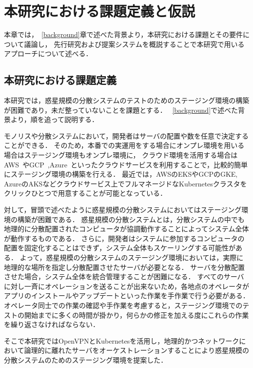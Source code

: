 \chapter{本研究における課題定義と仮説}
\label{issue}

本章では，~\ref{background}章で述べた背景より，本研究における課題とその要件について議論し，
先行研究および提案システムを概説することで本研究で用いるアプローチについて述べる．

\section{本研究における課題定義}
\label{issue:definition}

本研究では，惑星規模の分散システムのテストのためのステージング環境の構築が困難であり，未だ整っていないことを課題とする．
~\ref{background}で述べた背景より，順を追って説明する．

モノリスや分散システムにおいて，開発者はサーバの配置や数を任意で決定することができる．
そのため，本番での実運用をする場合にオンプレ環境を用いる場合はステージング環境もオンプレ環境に，
クラウド環境を活用する場合はAWS~\cite{AWS}やGCP~\cite{GCP},Azure~\cite{Azure}といったクラウドサービスを利用することで，比較的簡単にステージング環境の構築を行える．
最近では，AWSのEKSやGCPのGKE, AzureのAKSなどクラウドサービス上でフルマネージドなKubernetesクラスタをクリックひとつで用意することが可能となっている．

対して，冒頭で述べたように惑星規模の分散システムにおいてはステージング環境の構築が困難である．
惑星規模の分散システムとは，分散システムの中でも地理的に分散配置されたコンピュータが協調動作することによってシステム全体が動作するものである．
さらに，開発者はシステムに参加するコンピュータの配置を固定化することはできず，システム全体もスケーリングする可能性がある．
よって，惑星規模の分散システムのステージング環境においては，実際に地理的な場所を指定し分散配置させたサーバが必要となる．
サーバを分散配置させた場合，システム全体を統合管理することが困難になる．
すべてのサーバに対し一斉にオペレーションを送ることが出来ないため，各地点のオペレータがアプリのインストールやアップデートといった作業を手作業で行う必要がある．
オペレータ同士での作業の確認や手作業を考慮すると，ステージング環境でのテストの開始までに多くの時間が掛かり，何らかの修正を加える度にこれらの作業を繰り返さなければならない．

そこで本研究ではOpenVPNとKubernetesを活用し，地理的かつネットワークにおいて論理的に離れたサーバをオーケストレーションすることにより惑星規模の分散システムのためのステージング環境を提案した．

